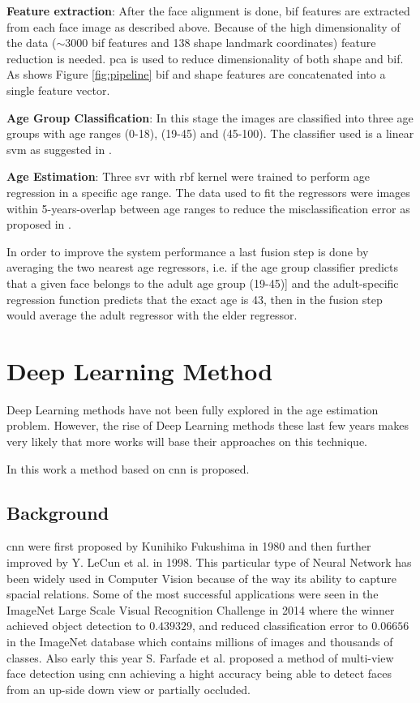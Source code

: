 \textbf{Feature extraction}: 
After the face alignment is done, \gls{bif} features are extracted from each face image as described above. Because of the high dimensionality of the data ($\sim3000$ \gls{bif} features and 138 shape landmark coordinates) feature reduction is needed. \gls{pca} is used to reduce dimensionality of both shape and \gls{bif}. As shows Figure \ref{fig:pipeline} \gls{bif} and shape features are concatenated into a single feature vector.

\textbf{Age Group Classification}:
In this stage the images are classified into three age groups with age ranges (0-18), (19-45) and (45-100). The classifier used is a linear \gls{svm} as suggested in \cite{4531189}.

\textbf{Age Estimation}:
Three \gls{svr} with \gls{rbf} kernel were trained to perform age regression in a specific age range. The data used to fit the regressors were images within 5-years-overlap between age ranges to reduce the misclassification error as proposed in \cite{han:age}. 

In order to improve the system performance a last fusion step is done by averaging the two nearest age regressors, i.e. if the age group classifier predicts that a given face belongs to the adult age group (19-45)] and the adult-specific regression function predicts that the exact age is 43, then in the fusion step would average the adult regressor with the elder regressor.


\section{Deep Learning Method}

Deep Learning methods have not been fully explored in the age estimation problem. However, the rise of Deep Learning methods these last few years makes very likely that more works will base their approaches on this technique.

In this work a method based on \gls{cnn} is proposed.

\subsection{Background}
\gls{cnn} were first proposed by Kunihiko Fukushima \cite{fukushima:neocognitronbc} in 1980 and then further improved by Y. LeCun et al. \cite{Lecun98gradient-basedlearning} in 1998. This particular type of Neural Network has been widely used in Computer Vision because of the way its ability to capture spacial relations. Some of the most successful applications were seen in the ImageNet Large Scale Visual Recognition Challenge \cite{DBLP:journals/corr/RussakovskyDSKSMHKKBBF14} in 2014 where the winner \cite{DBLP:journals/corr/SzegedyLJSRAEVR14} achieved object detection to $0.439329$, and reduced classification error to $0.06656$ in the ImageNet database which contains millions of images and thousands of classes. Also early this year S. Farfade et al. \cite{DBLP:journals/corr/FarfadeSL15} proposed a method of multi-view face detection using \gls{cnn} achieving a hight accuracy being able to detect faces from an up-side down view or partially occluded.

